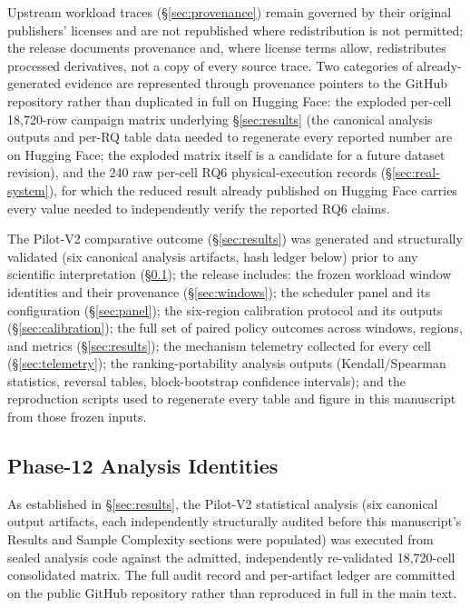 \documentclass[sn-basic,Numbered,pdflatex]{sn-jnl}
\begin{document}
Upstream workload traces (\S\ref{sec:provenance}) remain governed by their
original publishers' licenses and are not republished where redistribution
is not permitted; the release documents provenance and, where license
terms allow, redistributes processed derivatives, not a copy of every
source trace. Two categories of already-generated evidence are
represented through provenance pointers to the GitHub repository rather
than duplicated in full on Hugging Face: the exploded per-cell
18{,}720-row campaign matrix underlying \S\ref{sec:results} (the
canonical analysis outputs and per-RQ table data needed to regenerate
every reported number are on Hugging Face; the exploded matrix itself is
a candidate for a future dataset revision), and the 240 raw per-cell RQ6
physical-execution records (\S\ref{sec:real-system}), for which the
reduced result already published on Hugging Face carries every value
needed to independently verify the reported RQ6 claims.

The Pilot-V2 comparative outcome (\S\ref{sec:results}) was generated and
structurally validated (six canonical analysis artifacts, hash ledger
below) prior to any scientific interpretation (\S\ref{sec:artifact-hashes});
the release includes: the frozen workload window identities and their
provenance (\S\ref{sec:windows}); the scheduler panel and its
configuration (\S\ref{sec:panel}); the six-region calibration protocol and
its outputs (\S\ref{sec:calibration}); the full set of paired policy
outcomes across windows, regions, and metrics (\S\ref{sec:results}); the
mechanism telemetry collected for every cell (\S\ref{sec:telemetry}); the
ranking-portability analysis outputs (Kendall/Spearman statistics, reversal
tables, block-bootstrap confidence intervals); and the reproduction
scripts used to regenerate every table and figure in this manuscript from
those frozen inputs.

\subsection{Phase-12 Analysis Identities}
\label{sec:artifact-hashes}

As established in \S\ref{sec:results}, the Pilot-V2 statistical analysis
(six canonical output artifacts, each independently structurally audited
before this manuscript's Results and Sample Complexity sections were
populated) was executed from sealed analysis code against the admitted,
independently re-validated 18{,}720-cell consolidated matrix. The full
audit record and per-artifact ledger are committed on the public GitHub
repository rather than reproduced in full in the main text.
\end{document}
